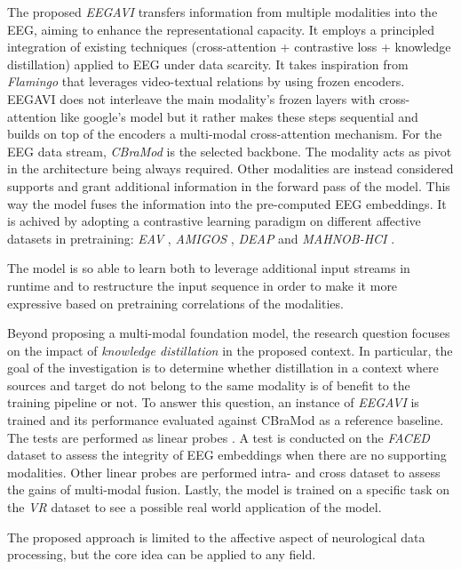The proposed \textit{EEGAVI} transfers information from multiple modalities into the EEG, aiming to enhance the representational capacity.
It employs a principled integration of existing techniques (cross-attention + contrastive loss + knowledge distillation) applied to EEG under data scarcity.
It takes inspiration from \textit{Flamingo} \cite{alayrac2022flamingovisuallanguagemodel} that leverages video-textual relations by using frozen encoders.
EEGAVI does not interleave the main modality's frozen layers with cross-attention like google's model but it rather
makes these steps sequential and builds on top of the encoders a multi-modal cross-attention mechanism.
For the EEG data stream, \textit{CBraMod} \cite{wang2025cbramodcrisscrossbrainfoundation} is the selected backbone.
The modality acts as pivot in the architecture being always required.
Other modalities are instead considered supports and grant additional information in the forward pass of the model.
This way the model fuses the information into the pre-computed EEG embeddings.
It is achived by adopting a contrastive learning paradigm on different affective datasets in pretraining: \textit{EAV} \cite{article-eav}, \textit{AMIGOS} \cite{8554112}, \textit{DEAP} \cite{5871728} and \textit{MAHNOB-HCI} \cite{5975141}. %

The model is so able to learn both to leverage additional input streams in runtime and to restructure the input sequence in order to make it more expressive based on pretraining correlations of the modalities.

Beyond proposing a multi-modal foundation model, the research question focuses on the impact of \textit{knowledge distillation} in the proposed context.
In particular, the goal of the investigation is to determine whether distillation in a context where sources and target do not belong to the same modality is of benefit to the training pipeline or not.
To answer this question, an instance of \textit{EEGAVI} is trained and its performance evaluated against CBraMod as a reference baseline.
The tests are performed as linear probes \cite{alain2018understandingintermediatelayersusing}.
A test is conducted on the \textit{FACED} \cite{Chen2023} dataset to assess the integrity of EEG embeddings when there are no supporting modalities.
Other linear probes are performed intra- and cross dataset to assess the gains of multi-modal fusion.
Lastly, the model is trained on a specific task on the \textit{VR} dataset to see a possible real world application of the model. %


The proposed approach is limited to the affective aspect of neurological data processing, but the core idea can be applied to any field. 
